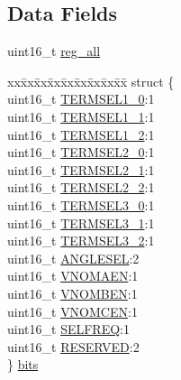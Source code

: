 \subsection*{Data Fields}
\begin{DoxyCompactItemize}
\item 
uint16\-\_\-t \hyperlink{a00021_a74e4d0cc3da3b66723322f38bfb7f371}{reg\-\_\-all}
\item 
\begin{tabbing}
xx\=xx\=xx\=xx\=xx\=xx\=xx\=xx\=xx\=\kill
struct \{\\
\>uint16\_t \hyperlink{a00021_ab504d7ff291bba168d0bed4071e269f6}{TERMSEL1\_0}:1\\
\>uint16\_t \hyperlink{a00021_afb45d5a8fc50dbf0f1aeacbac371726d}{TERMSEL1\_1}:1\\
\>uint16\_t \hyperlink{a00021_ab907591a01325a0270cb9f9e6f83cc00}{TERMSEL1\_2}:1\\
\>uint16\_t \hyperlink{a00021_aeb9fb2bff5216fa9849b875862ed23ec}{TERMSEL2\_0}:1\\
\>uint16\_t \hyperlink{a00021_aa919a8f7b4bd25c24e2a204b38f3d01d}{TERMSEL2\_1}:1\\
\>uint16\_t \hyperlink{a00021_a8b6ecef8f75e2f31536e2328fa01071d}{TERMSEL2\_2}:1\\
\>uint16\_t \hyperlink{a00021_aa47dda53c7c2f72eb9e1e36b651eaecb}{TERMSEL3\_0}:1\\
\>uint16\_t \hyperlink{a00021_ae10a8638958d10a3a00d9252188533c0}{TERMSEL3\_1}:1\\
\>uint16\_t \hyperlink{a00021_a5725ed9afaf6b7084bb214c21d3ca2c2}{TERMSEL3\_2}:1\\
\>uint16\_t \hyperlink{a00021_a4877943f30711d8b2dcd86bb449e5eba}{ANGLESEL}:2\\
\>uint16\_t \hyperlink{a00021_ad345cee8b6a6c1c0d928ba456681dbf2}{VNOMAEN}:1\\
\>uint16\_t \hyperlink{a00021_aecd6c7afe1755d7eeb19009fd79ae48e}{VNOMBEN}:1\\
\>uint16\_t \hyperlink{a00021_a20177bdcd0f50acba5d42927ac28e5f1}{VNOMCEN}:1\\
\>uint16\_t \hyperlink{a00021_a56816cd17914e35ca39228bbe5545dce}{SELFREQ}:1\\
\>uint16\_t \hyperlink{a00021_a9484db76faad15bb8da293c622dd2269}{RESERVED}:2\\
\} \hyperlink{a00021_adcc1b05e99ccb27a811df890d7f3f420}{bits}\\

\end{tabbing}\end{DoxyCompactItemize}


